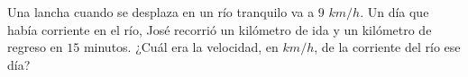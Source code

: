 Una lancha cuando se desplaza en un río tranquilo va a $9$ $km/h$. Un día que había corriente en el río, José recorrió un kilómetro de ida y un kilómetro de regreso en $15$ minutos. ¿Cuál era la velocidad, en $km/h$, de la corriente del río ese día?